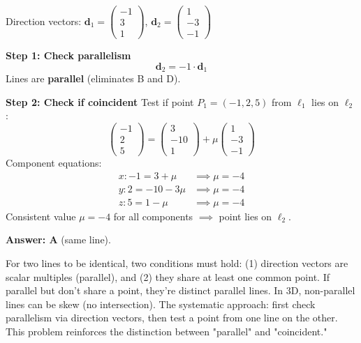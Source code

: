 \begin{solution}
Direction vectors: $\mathbf{d}_1 = \begin{pmatrix} -1 \\ 3 \\ 1 \end{pmatrix}$, $\mathbf{d}_2 = \begin{pmatrix} 1 \\ -3 \\ -1 \end{pmatrix}$

\textbf{Step 1: Check parallelism}
$$\mathbf{d}_2 = -1 \cdot \mathbf{d}_1$$
Lines are \textbf{parallel} (eliminates B and D).

\textbf{Step 2: Check if coincident}
Test if point $P_1 = (-1, 2, 5)$ from $\ell_1$ lies on $\ell_2$:
$$\begin{pmatrix} -1 \\ 2 \\ 5 \end{pmatrix} = \begin{pmatrix} 3 \\ -10 \\ 1 \end{pmatrix} + \mu \begin{pmatrix} 1 \\ -3 \\ -1 \end{pmatrix}$$
Component equations:
\begin{align*}
x: -1 = 3 + \mu &\implies \mu = -4\\
y: 2 = -10 - 3\mu &\implies \mu = -4\\
z: 5 = 1 - \mu &\implies \mu = -4
\end{align*}
Consistent value $\mu = -4$ for all components $\implies$ point lies on $\ell_2$.

\textbf{Answer: A} (same line).
\end{solution}

\begin{takeaways}
For two lines to be identical, two conditions must hold: (1) direction vectors are scalar multiples (parallel), and (2) they share at least one common point. If parallel but don't share a point, they're distinct parallel lines. In 3D, non-parallel lines can be skew (no intersection). The systematic approach: first check parallelism via direction vectors, then test a point from one line on the other. This problem reinforces the distinction between "parallel" and "coincident."
\end{takeaways}


